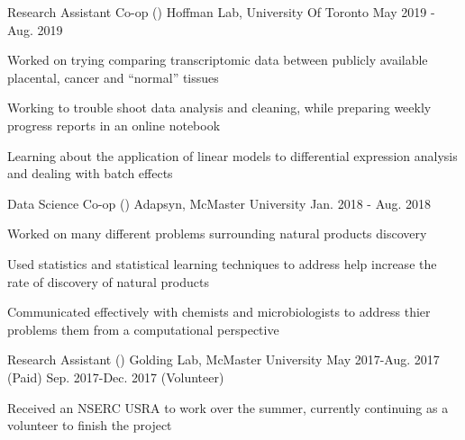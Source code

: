 \begin{cventries}
    \cventry
    {Research Assistant Co-op ()}
      {Hoffman Lab, University Of Toronto}
      {May 2019 - Aug. 2019}
      {}
      {
        \begin{cvitems}
         \item {Worked on trying comparing transcriptomic data between publicly available placental, cancer and ``normal'' tissues}
         \item {Working to trouble shoot data analysis and cleaning, while preparing weekly progress reports in an online notebook}
         \item {Learning about the application of linear models to differential expression analysis and dealing with batch effects}
        \end{cvitems}
      }
    \cventry
      {Data Science Co-op ()}
      {Adapsyn, McMaster University}
      {Jan. 2018 - Aug. 2018}
      {}
      {
        \begin{cvitems}
         \item {Worked on many different problems surrounding natural products discovery}
         \item {Used statistics and statistical learning techniques to address help increase the rate of discovery of natural products}
         \item {Communicated effectively with chemists and microbiologists to address thier problems them from a computational perspective}
        \end{cvitems}
      }
    \cventry
      {Research Assistant ()}
      {Golding Lab, McMaster University}
      {May 2017-Aug. 2017 (Paid)}
      {Sep. 2017-Dec. 2017 (Volunteer)}
      {
        \begin{cvitems}
          \item {Received an NSERC USRA to work over the summer, currently continuing as a volunteer to finish the project}

\end{cvitems}}
\end{cventries}
